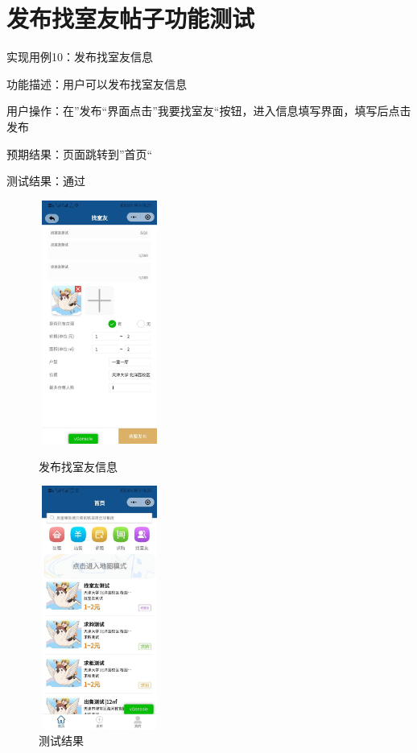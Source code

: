    \section{发布找室友帖子功能测试}

实现用例10：发布找室友信息

功能描述：用户可以发布找室友信息

用户操作：在”发布“界面点击”我要找室友“按钮，进入信息填写界面，填写后点击发布

预期结果：页面跳转到”首页“

测试结果：通过
\newpage 
\begin{figure}[htbp]
    \centering
    \begin{minipage}[t]{0.48\textwidth}
    \centering
    \includegraphics[width=4cm,height=8cm]{test/image/test34.png} 
 
   \caption{发布找室友信息} 
    \end{minipage}
    \begin{minipage}[t]{0.48\textwidth}
    \centering
    \includegraphics[width=4cm,height=8cm]{test/image/test35.png}
    \caption{测试结果}
    \end{minipage}
    \end{figure}


